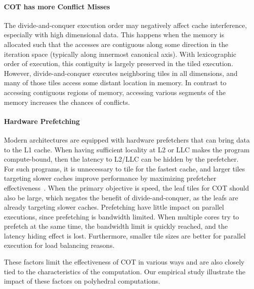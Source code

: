 
\paragraph{COT has more Conflict Misses} The divide-and-conquer execution
order may negatively affect cache interference, especially with high
dimensional data.  This happens when the memory is allocated such that the
accesses are contiguous along some direction in the iteration space (typically
along innermost canonical axis).  With lexicographic order of execution, this
contiguity is largely preserved in the tiled execution.  However,
divide-and-conquer executes neighboring tiles in all dimensions, and many of
those tiles access some distant location in memory.  In contrast to accessing
contiguous regions of memory, accessing various segments of the memory
increases the chances of conflicts.

\paragraph{Hardware Prefetching}  Modern architectures are equipped with
hardware prefetchers that can bring data to the L1 cache. When
having sufficient locality at L2 or LLC makes the program compute-bound, then
the latency to L2/LLC can be hidden by the prefetcher. For such programs, it is
unnecessary to tile for the fastest cache, and larger tiles targeting slower
caches improve performance by maximizing prefetcher
effectiveness~\cite{mehta2016turbotiling}. When the primary objective is speed,
the leaf tiles for COT should also be large, which negates the benefit of
divide-and-conquer, as the leafs are already targeting slower caches.
Prefetching have little impact on parallel executions, since prefetching is
bandwidth limited. When multiple cores try to prefetch at the same time,
the bandwidth limit is quickly reached, and the latency hiding effect is
lost. Furthermore, smaller tile sizes are better for parallel execution for
load balancing  reasons.


These factors limit the effectiveness of COT in various ways and are also
closely tied to the characteristics of the computation. Our empirical study
illustrate the impact of these factors on polyhedral computations.

